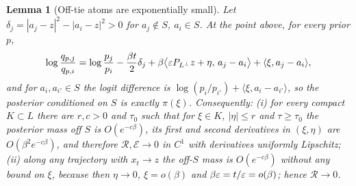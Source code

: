 \documentclass{article} %
\theoremstyle{plain}
\newtheorem{lemma}[theorem]{Lemma}
\theoremstyle{definition}
\theoremstyle{remark}
\begin{document}
\begin{lemma}[Off-tie atoms are exponentially small]
\label{lem:offtie}
Let $\delta_j=|a_j-z|^2-|a_i-z|^2>0$ for $a_j\notin S$, $a_i\in S$. At the point above, for every
prior $p$,
\[
\log\frac{q_{p,j}}{q_{p,i}}=\log\frac{p_j}{p_i}-\frac{\beta t}2\delta_j
+\beta\big\langle\varepsilon P_{L^\perp}z+\eta,\,a_j-a_i\big\rangle+\langle\xi,a_j-a_i\rangle,
\]
and for $a_i,a_{i'}\in S$ the logit difference is $\log(p_i/p_{i'})+\langle\xi,a_i-a_{i'}\rangle$, so the
posterior conditioned on $S$ is exactly $\pi(\xi)$. Consequently: (i) for every compact
$K\subset L$ there are $r,c>0$ and $\tau_0$ such that for $\xi\in K$, $|\eta|\le r$ and
$\tau\ge\tau_0$ the posterior mass off $S$ is $O(e^{-c\beta})$, its first and second derivatives
in $(\xi,\eta)$ are $O(\beta^2e^{-c\beta})$, and therefore $\mathcal R,\mathcal E\to0$ in $C^1$ with
derivatives uniformly Lipschitz; (ii) along any trajectory with $x_t\to z$ the off-$S$ mass is
$O(e^{-c\beta})$ without any bound on $\xi$, because then $\eta\to0$, $\xi=o(\beta)$ and
$\beta\varepsilon=t/\varepsilon=o(\beta)$; hence $\mathcal R\to0$.
\end{lemma}
\end{document}
